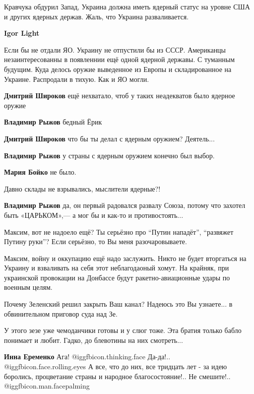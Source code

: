 \begin{itemize}
\begin{itemize}
Кравчука обдурил Запад, Украина должна иметь ядерный статус на уровне США и
других ядерных держав. Жаль, что Украина разваливается.

\textbf{Igor Light} 

Если бы не отдали ЯО. Украину не отпустили бы из СССР. Американцы
незаинтересованны в появленнии ещё одной ядерной державы. С туманным будущим.
Куда делось оружие выведенное из Европы и складированное на Украине. Распродали
в тихую. Как и ЯО могли.


\textbf{Дмитрий Широков} ещё нехватало, чтоб у таких неадекватов было ядерное оружие

\textbf{Владимир Рыжов} бедный Ёрик

\textbf{Дмитрий Широков} что бы ты делал с ядерным оружием? Деятель...

\textbf{Владимир Рыжов} у страны с ядерным оружием конечно был выбор.

\textbf{Мария Бойко} не было.

Давно склады не взрывались, мыслители ядерные?!

\textbf{Владимир Рыжов} да, он первый радовался развалу Союза, потому что захотел быть «ЦАРЬКОМ»,— а мог бы и как-то и противостоять...
\end{itemize} %


Максим, вот не надоело ещё? Ты серьёзно про \enquote{Путин нападёт}, \enquote{развяжет Путину
руки}? Если серьёзно, то Вы меня разочаровываете.

Максим, войну и оккупацию ещё надо заслужить. Никто не будет вторгаться на
Украину и взваливать на себя этот неблагодаоный хомут. На крайняк, при
украинской провокации на Донбассе будут ракетно-авиационные удары по военным
целям.

Почему Зеленский решил закрыть Ваш канал? Надеюсь это Вы узнаете... в
обвинительном приговор суда над Зе.


У этого зезе уже чемоданчики готовы и у слюг тоже. Эта братия только бабло
понимает и любит. Гадко, до блевотины на них смотреть...

\begin{itemize} %
\textbf{Инна Еременко}
Ага! @igg{fbicon.thinking.face} 
Да-да!.. @igg{fbicon.face.rolling.eyes} 
А все, что до них, все тридцать лет - за идею боролись, процветание страны и народное благосостояние!..
Не смешите!.. @igg{fbicon.man.facepalming} 


\end{itemize}
\end{itemize}
